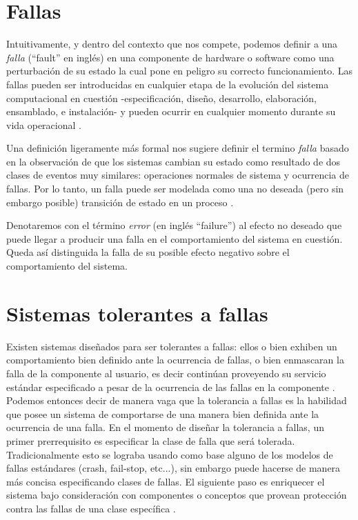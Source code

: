 \documentclass[titlepage, 12pt]{book}
\begin{document}



\section{Fallas}
Intuitivamente, y dentro del contexto que nos compete, podemos definir a una \textit{falla} (``fault'' en ingl\'es) en una componente de hardware o software como una perturbaci\'on de su estado la cual pone en peligro su correcto funcionamiento. Las fallas pueden ser introducidas en cualquier etapa de la evoluci\'on del sistema computacional en cuesti\'on -especificaci\'on, dise\~no, desarrollo, elaboraci\'on, ensamblado, e instalaci\'on- y pueden ocurrir en cualquier momento durante su vida operacional \cite{FaultInject}.

Una definici\'on ligeramente m\'as formal nos sugiere definir el termino \textit{falla} basado en la observaci\'on de que los sistemas cambian su estado como resultado de dos clases de eventos muy similares: operaciones normales de sistema y ocurrencia de fallas. Por lo tanto, un falla puede ser modelada como una no deseada (pero sin embargo posible) transici\'on de estado en un proceso \cite{Felix}.

Denotaremos con el t\'ermino \textit{error} (en ingl\'es ``failure'') al efecto no deseado que puede llegar a producir una falla en el comportamiento del sistema en cuesti\'on. Queda as\'i distinguida la falla de su posible efecto negativo sobre el comportamiento del sistema.






\section{Sistemas tolerantes a fallas}
Existen sistemas dise\~nados para ser tolerantes a fallas: ellos o bien exhiben un comportamiento bien definido ante la ocurrencia de fallas, o bien enmascaran la falla de la componente al usuario, es decir contin\'uan proveyendo su servicio est\'andar especificado a pesar de la ocurrencia de las fallas en la componente \cite{Cristian}. Podemos entonces decir de manera vaga que la tolerancia a fallas es la habilidad que posee un sistema de comportarse de una manera bien definida ante la ocurrencia de una falla. En el momento de dise\~nar la tolerancia a fallas, un primer prerrequisito es especificar la clase de falla que ser\'a tolerada. Tradicionalmente esto se lograba usando como base alguno de los modelos de fallas est\'andares (crash, fail-stop, etc...), sin embargo puede hacerse de manera m\'as concisa especificando clases de fallas. El siguiente paso es enriquecer el sistema bajo consideraci\'on con componentes o conceptos que provean protecci\'on contra las fallas de una clase espec\'ifica \cite{FaultInject}.
\end{document}
